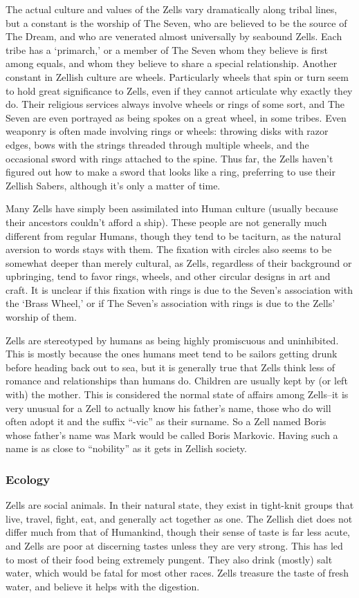 \documentclass[oneside,11pt,english]{book}
\begin{document}
The actual culture and values of the Zells vary dramatically along tribal lines, but a constant is the 
worship of The Seven, who are believed to be the source of The Dream, and who are venerated almost 
universally by seabound Zells. Each tribe has a ‘primarch,’ or a member of The Seven whom they believe 
is first among equals, and whom they believe to share a special relationship. Another constant in Zellish 
culture are wheels. Particularly wheels that spin or turn seem to hold great significance to Zells, even if 
they cannot articulate why exactly they do. Their religious services always involve wheels or rings of 
some sort, and The Seven are even portrayed as being spokes on a great wheel, in some tribes. Even 
weaponry is often made involving rings or wheels: throwing disks with razor edges, bows with the strings 
threaded through multiple wheels, and the occasional sword with rings attached to the spine. Thus far, the 
Zells haven't figured out how to make a sword that looks like a ring, preferring to use their Zellish Sabers, although it's only a matter of time. 


Many Zells have simply been assimilated into Human culture (usually because their ancestors couldn't 
afford a ship). These people are not generally much different from regular Humans, though they tend to 
be taciturn, as the natural aversion to words stays with them. The fixation with circles also seems to be 
somewhat deeper than merely cultural, as Zells, regardless of their background or upbringing, tend to 
favor rings, wheels, and other circular designs in art and craft. It is unclear if this fixation with rings is 
due to the Seven's association with the ‘Brass Wheel,’ or if The Seven's association with rings is due to 
the Zells' worship of them. 


Zells are stereotyped by humans as being highly promiscuous and uninhibited. This is mostly because the 
ones humans meet tend to be sailors getting drunk before heading back out to sea, but it is generally true 
that Zells think less of romance and relationships than humans do. Children are usually kept by (or left 
with) the mother. This is considered the normal state of affairs among Zells--it is very unusual for a Zell 
to actually know his father’s name, those who do will often adopt it and the suffix “-vic” as their surname. 
So a Zell named Boris whose father’s name was Mark would be called Boris Markovic. Having such a 
name is as close to “nobility” as it gets in Zellish society. 

\subsubsection*{Ecology} 
Zells are social animals. In their natural state, they exist in tight-knit groups that live, travel, fight, eat, and 
generally act together as one. The Zellish diet does not differ much from that of Humankind, though their 
sense of taste is far less acute, and Zells are poor at discerning tastes unless they are very strong. This has 
led to most of their food being extremely pungent. They also drink (mostly) salt water, which would be 
fatal for most other races. Zells treasure the taste of fresh water, and believe it helps with the digestion. 
\end{document}
